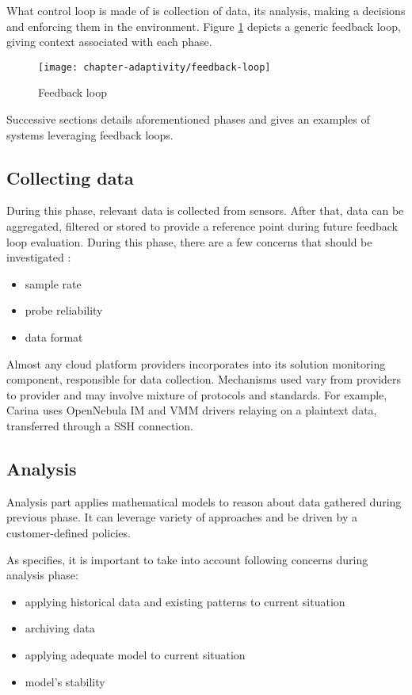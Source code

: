 What control loop is made of is collection of data, its analysis, making a decisions and enforcing them in the environment. Figure \ref{fig:feedback-loop} depicts a generic feedback loop, giving context associated with each phase.

\begin{figure}[!ht]
  \begin{center}
    \texttt{[image: chapter-adaptivity/feedback-loop]}
  \end{center}
  \caption{Feedback loop \cite{brun2009engineering}}
  \label{fig:feedback-loop}
\end{figure}

Successive sections details aforementioned phases and gives an examples of systems leveraging feedback loops.

\subsection{Collecting data}
During this phase, relevant data is collected from sensors. After that, data can be aggregated, filtered or stored to provide a reference point during future feedback loop evaluation. During this phase, there are a few concerns that should be investigated \cite{brun2009engineering}:
\begin{itemize}
 \item sample rate
 \item probe reliability
 \item data format
\end{itemize}

Almost any cloud platform providers incorporates into its solution monitoring component, responsible for data collection. Mechanisms used vary from providers to provider and may involve mixture of protocols and standards. For example, Carina \cite{Carina} uses OpenNebula IM and VMM drivers relaying on a plaintext data, transferred through a SSH connection.

\subsection{Analysis}
Analysis part applies mathematical models to reason about data gathered during previous phase. It can leverage variety of approaches and be driven by a customer-defined policies.

As \cite{brun2009engineering} specifies, it is important to take into account following concerns during analysis phase:
\begin{itemize}
 \item applying historical data and existing patterns to current situation
 \item archiving data
 \item applying adequate model to current situation
 \item model's stability
\end{itemize}

